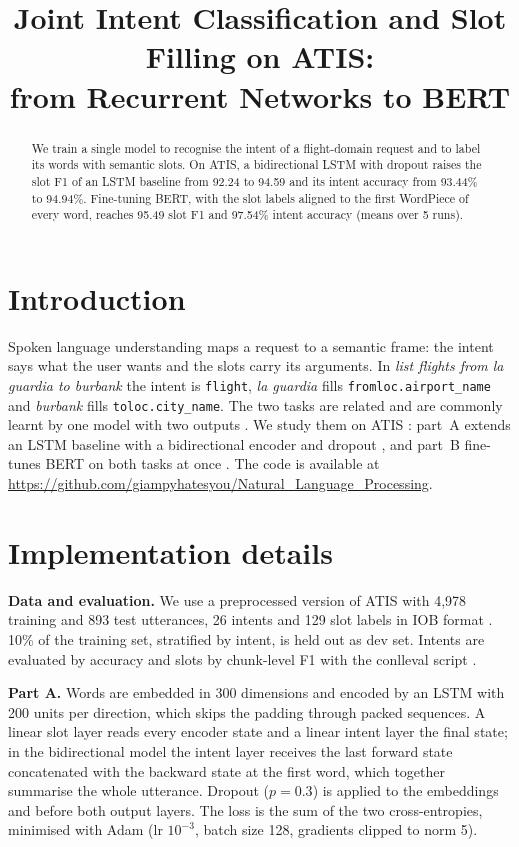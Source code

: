 \documentclass[a4paper]{article}
\title{Joint Intent Classification and Slot Filling on ATIS:\\from Recurrent Networks to BERT}
\begin{document}
\maketitle

\begin{abstract}
We train a single model to recognise the intent of a flight-domain request and to label its words with semantic
slots. On ATIS, a bidirectional LSTM with dropout raises the slot F1 of an LSTM baseline from 92.24 to 94.59 and
its intent accuracy from 93.44\% to 94.94\%. Fine-tuning BERT, with the slot labels aligned to the first WordPiece
of every word, reaches 95.49 slot F1 and 97.54\% intent accuracy (means over 5 runs).
\end{abstract}

\section{Introduction}

Spoken language understanding maps a request to a semantic frame: the intent says what the user wants and the slots
carry its arguments. In \emph{list flights from la guardia to burbank} the intent is \texttt{flight}, \emph{la
guardia} fills \texttt{fromloc.airport\_name} and \emph{burbank} fills \texttt{toloc.city\_name}. The two tasks are
related and are commonly learnt by one model with two outputs \cite{liu2016joint}. We study them on ATIS
\cite{hemphill1990atis}: part~A extends an LSTM baseline with a bidirectional encoder \cite{schuster1997birnn} and dropout \cite{srivastava2014dropout}, and part~B fine-tunes BERT
\cite{devlin2019bert} on both tasks at once \cite{chen2019jointbert}. The code is available at
\url{https://github.com/giampyhatesyou/Natural_Language_Processing}.

\section{Implementation details}

\textbf{Data and evaluation.} We use a preprocessed version of ATIS with 4,978 training and 893 test utterances,
26 intents and 129 slot labels in IOB format \cite{ramshaw1995iob}. 10\% of the training set, stratified by intent,
is held out as dev set. Intents are evaluated by accuracy and slots by chunk-level F1 with the conlleval script
\cite{tjongkimsang2000conll}.

\textbf{Part A.} Words are embedded in 300 dimensions and encoded by an LSTM with 200 units per direction, which
skips the padding through packed sequences. A linear slot layer reads every encoder state and a linear intent layer
the final state; in the bidirectional model the intent layer receives the last forward state concatenated with the
backward state at the first word, which together summarise the whole utterance. Dropout ($p=0.3$) is applied to the
embeddings and before both output layers. The loss is the sum of the two cross-entropies, minimised with Adam
\cite{kingma2015adam} (lr $10^{-3}$, batch size 128, gradients clipped to norm 5).
\end{document}
